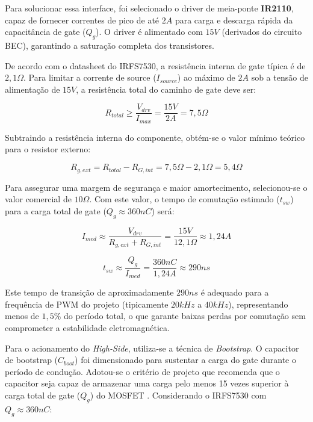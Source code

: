 Para solucionar essa interface, foi selecionado o driver de meia-ponte \textbf{IR2110}, capaz de fornecer correntes de pico de até $2A$ para carga e descarga rápida da capacitância de gate ($Q_g$). O driver é alimentado com $15V$ (derivados do circuito BEC), garantindo a saturação completa dos transistores.

De acordo com o datasheet do IRFS7530, a resistência interna de gate típica é de $2,1 \Omega$. Para limitar a corrente de source ($I_{source}$) ao máximo de $2A$ sob a tensão de alimentação de $15V$, a resistência total do caminho de gate deve ser:

\begin{equation}
    R_{total} \geq \frac{V_{drv}}{I_{max}} = \frac{15V}{2A} = 7,5 \Omega
\end{equation}

Subtraindo a resistência interna do componente, obtém-se o valor mínimo teórico para o resistor externo:

\begin{equation}
    R_{g,ext} = R_{total} - R_{G,int} = 7,5 \Omega - 2,1 \Omega = 5,4 \Omega
\end{equation}

Para assegurar uma margem de segurança e maior amortecimento, selecionou-se o valor comercial de \textbf{$10 \Omega$}. Com este valor, o tempo de comutação estimado ($t_{sw}$) para a carga total de gate ($Q_g \approx 360nC$) será:

\begin{equation}
    I_{med} \approx \frac{V_{drv}}{R_{g,ext} + R_{G,int}} = \frac{15V}{12,1 \Omega} \approx 1,24 A
\end{equation}

\begin{equation}
    t_{sw} \approx \frac{Q_g}{I_{med}} = \frac{360nC}{1,24A} \approx 290 ns
\end{equation}

Este tempo de transição de aproximadamente $290ns$ é adequado para a frequência de PWM do projeto (tipicamente $20kHz$ a $40kHz$), representando menos de $1,5\%$ do período total, o que garante baixas perdas por comutação sem comprometer a estabilidade eletromagnética.

Para o acionamento do \textit{High-Side}, utiliza-se a técnica de \textit{Bootstrap}. O capacitor de bootstrap ($C_{boot}$) foi dimensionado para sustentar a carga do gate durante o período de condução. Adotou-se o critério de projeto que recomenda que o capacitor seja capaz de armazenar uma carga pelo menos 15 vezes superior à carga total de gate ($Q_g$) do MOSFET \cite{adamsDT98}. Considerando o IRFS7530 com $Q_g \approx 360nC$:

